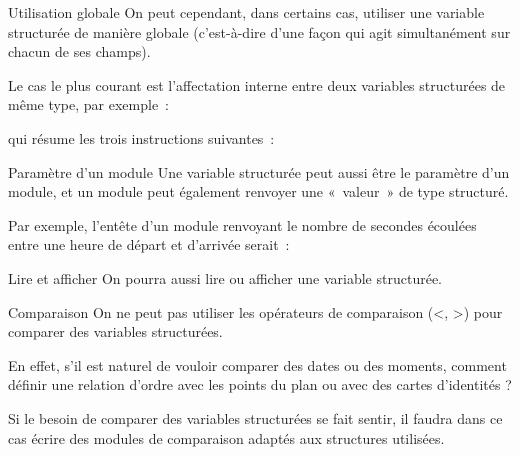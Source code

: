 \begin{frame}{Utilisation globale}
		On peut cependant, dans certains cas, utiliser
	une variable structurée de manière globale (c’est-à-dire d’une façon
	qui agit simultanément sur chacun de ses champs). 
	
	\bigskip
	
	Le cas le plus
	courant est l’affectation interne entre deux variables structurées de
	même type, par exemple~:

	\bigskip
	

	\bigskip
	
	qui résume les trois instructions suivantes~:

	\bigskip
	
\end{frame}

\begin{frame}{Paramètre d'un module}
	Une variable structurée peut aussi être le
	paramètre d’un module, et un module peut également renvoyer une
	«~valeur~» de type structuré. 
	
	\bigskip
	
	Par exemple, l’entête d’un module
	renvoyant le nombre de secondes écoulées entre une heure de départ et
	d’arrivée serait~:

	\bigskip
	
\end{frame}

\begin{frame}{Lire et afficher}
	On pourra aussi lire ou afficher une variable structurée.

	\bigskip
	
\end{frame}

\begin{frame}{Comparaison}
	On ne peut pas utiliser les opérateurs de comparaison ({\textless}, {\textgreater}) pour
	comparer des variables structurées. 
	
	\bigskip
	
	En effet, s’il est naturel de vouloir comparer des dates ou des moments,
	comment définir une relation d’ordre avec les points du plan ou avec
	des cartes d’identités ?

	\bigskip
	
	Si le besoin de comparer des variables
	structurées se fait sentir, il faudra dans ce cas écrire des modules de
	comparaison adaptés aux structures utilisées.
\end{frame}

